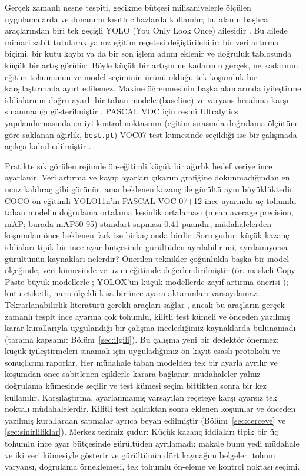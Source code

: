 \documentclass[pdflatex,iicol,sn-mathphys-num]{sn-jnl}
\begin{document}
Gerçek zamanlı nesne tespiti, gecikme bütçesi milisaniyelerle ölçülen uygulamalarda ve donanımı kısıtlı cihazlarda kullanılır; bu alanın başlıca araçlarından biri tek geçişli YOLO (You Only Look Once) ailesidir \cite{redmon_2016_yolo,jocher_2024_yolo11}. Bu ailede mimari sabit tutularak yalnız eğitim reçetesi değiştirilebilir: bir veri artırma biçimi, bir kutu kaybı ya da bir son işlem adımı eklenir ve doğruluk tablosunda küçük bir artış görülür. Böyle küçük bir artışın ne kadarının gerçek, ne kadarının eğitim tohumunun ve model seçiminin ürünü olduğu tek koşumluk bir karşılaştırmada ayırt edilemez. Makine öğrenmesinin başka alanlarında iyileştirme iddialarının doğru ayarlı bir taban modele (baseline) ve varyans hesabına karşı sınanmadığı gösterilmiştir \cite{lipton_2019_troubling}. PASCAL VOC için resmî Ultralytics yapılandırmasında en iyi kontrol noktasının (eğitim sırasında doğrulama ölçütüne göre saklanan ağırlık, \texttt{best.pt}) VOC07 test kümesinde seçildiği ise bir çalışmada açıkça kabul edilmiştir \cite{lin_2026_yolopeft}.

Pratikte sık görülen rejimde ön-eğitimli küçük bir ağırlık hedef veriye ince ayarlanır. Veri artırma ve kayıp ayarları çıkarım grafiğine dokunmadığından en ucuz kaldıraç gibi görünür, ama beklenen kazanç ile gürültü aynı büyüklüktedir: COCO ön-eğitimli YOLO11n'in PASCAL VOC 07+12 ince ayarında üç tohumlu taban modelin doğrulama ortalama kesinlik ortalaması (mean average precision, mAP; burada mAP50-95) standart sapması 0.41 puandır, müdahalelerden koşumdan önce beklenen fark ise birkaç onda birdir. Soru şudur: küçük kazanç iddiaları tipik bir ince ayar bütçesinde gürültüden ayrılabilir mi, ayrılamıyorsa gürültünün kaynakları nelerdir?
Önerilen teknikler çoğunlukla başka bir model ölçeğinde, veri kümesinde ve uzun eğitimde değerlendirilmiştir (ör. maskeli Copy-Paste büyük modellerle \cite{ghiasi_2021_copypaste}; YOLOX'un küçük modellerde zayıf artırma önerisi \cite{ge_2021_yolox}); kutu etiketli, nano ölçekli kısa bir ince ayara aktarımları varsayılamaz. Tekrarlanabilirlik literatürü gerekli araçları sağlar \cite{bouthillier_2021_variance,picard_2021_seed}, ancak bu araçların gerçek zamanlı tespit ince ayarına çok tohumlu, kilitli test kümeli ve önceden yazılmış karar kurallarıyla uygulandığı bir çalışma incelediğimiz kaynaklarda bulunamadı (tarama kapsamı: Bölüm~\ref{sec:ilgili}).
Bu çalışma yeni bir dedektör önermez; küçük iyileştirmeleri sınamak için uyguladığımız ön-kayıt esaslı protokolü ve sonuçlarını raporlar. Her müdahale taban modelden tek bir ayarla ayrılır ve koşumdan önce sabitlenen eşiklerle karara bağlanır; müdahaleler yalnız doğrulama kümesinde seçilir ve test kümesi seçim bittikten sonra bir kez kullanılır. Karşılaştırma, ayarlanmamış varsayılan reçeteye karşı ayarsız tek noktalı müdahalelerdir. Kilitli test açıldıktan sonra eklenen koşumlar ve önceden yazılmış kurallardan sapmalar ayrıca beyan edilmiştir (Bölüm~\ref{sec:cerceve} ve \ref{sec:sinirliliklar}). Merkez tezimiz şudur: Küçük kazanç iddiaları tipik bir üç tohumlu ince ayar bütçesinde gürültüden ayrılamadı; makale bunu yedi müdahale ve iki veri kümesiyle gösterir ve gürültünün dört kaynağını belgeler: tohum varyansı, doğrulama örneklemesi, tek tohumlu ön-eleme ve kontrol noktası seçimi.
\end{document}

